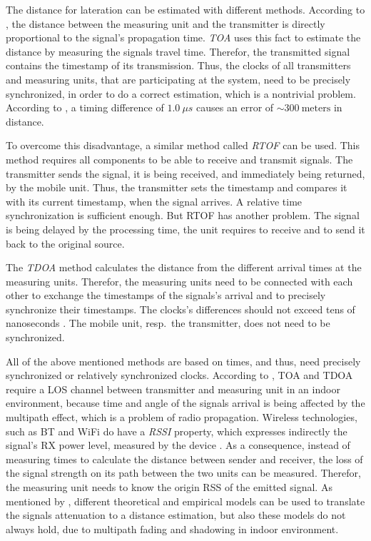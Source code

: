 The distance for lateration can be estimated with different methods. According to \citet{IEEE:survey_wireless_indoor_pos}, the distance between the measuring unit and the transmitter is directly proportional to the signal's propagation time.
\emph{\ac{TOA}} uses this fact to estimate the distance by measuring the signals travel time. Therefor, the transmitted signal contains the timestamp of its transmission. Thus, the clocks of all transmitters and measuring units, that are participating at the system, need to be precisely synchronized, in order to do a correct estimation, which is a nontrivial problem. According to \citet{kotanen:exp_local_pos_bt}, a timing difference of  $1.0~\mu s$ causes an error of $\sim 300~\text{meters}$ in distance.

To overcome this disadvantage, a similar method called \emph{\ac{RTOF}} can be used. This method requires all components to be able to receive and transmit signals. The transmitter sends the signal, it is being received, and immediately being returned, by the mobile unit. Thus, the transmitter sets the timestamp and compares it with its current timestamp, when the signal arrives. A relative time synchronization is sufficient enough. But \acs{RTOF} has another problem. The signal is being delayed by the processing time, the unit requires to receive and to send it back to the original source.

The \emph{\ac{TDOA}} method calculates the distance from the different arrival times at the measuring units. Therefor, the measuring units need to be connected with each other to exchange the timestamps of the signals's arrival and to precisely synchronize their timestamps. The clocks's differences should not exceed tens of nanoseconds \citep{kotanen:exp_local_pos_bt}. The mobile unit, resp.\ the transmitter, does not need to be synchronized. 

All of the above mentioned methods are based on times, and thus, need precisely synchronized or relatively synchronized clocks. According to \citet{IEEE:survey_wireless_indoor_pos}, \acs{TOA} and \acs{TDOA} require a \acs{LOS} channel between transmitter and measuring unit in an indoor environment, because time and angle of the signals arrival is being affected by the multipath effect, which is a problem of radio propagation. Wireless technologies, such as \acl{BT} and WiFi do have a \emph{\ac{RSSI}} property, which expresses indirectly the signal's RX power level, measured by the device \citep{kotanen:exp_local_pos_bt}. As a consequence, instead of measuring times to calculate the distance between sender and receiver, the loss of the signal strength on its path between the two units can be measured. Therefor, the measuring unit needs to know the origin \ac{RSS} of the emitted signal. As mentioned by \citet{IEEE:survey_wireless_indoor_pos}, different theoretical and empirical models can be used to translate the signals attenuation to a distance estimation, but also these models do not always hold, due to multipath fading and shadowing in indoor environment.

